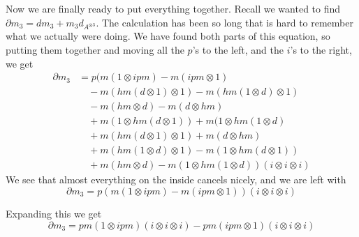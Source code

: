 Now we are finally ready to put everything together. Recall we wanted to find $\partial m_3 = dm_3 + m_3d_{A^{\otimes 3}}$. The calculation has been so long that is hard to remember what we actually were doing. We have found both parts of this equation, so putting them together and moving all the $p$'s to the left, and the $i$'s to the right, we get
\begin{align*}
    \partial m_3
    &=
    p(m(1\otimes ipm)-m(ipm\otimes 1) \\
    &\quad - m(hm(d\otimes 1)\otimes 1) - m(hm(1\otimes d)\otimes 1) \\
    &\quad -m(hm\otimes d)-m(d\otimes hm) \\
    &\quad +m(1\otimes hm(d\otimes 1))+m(1\otimes hm(1\otimes d) \\
    &\quad
    +m(hm(d\otimes 1)\otimes 1)
    +m(d\otimes hm) \\
    &\quad 
    +m(hm(1\otimes d)\otimes 1)
    -m(1\otimes hm(d\otimes 1)) \\
    &\quad  
    +m(hm\otimes d)
    -m(1\otimes hm(1\otimes d))(i\otimes i\otimes i)
\end{align*}
We see that almost everything on the inside cancels nicely, and we are left with 
\begin{equation*}
    \partial m_3 = p(m(1\otimes ipm)-m(ipm\otimes 1))(i\otimes i\otimes i)
\end{equation*}

Expanding this we get 
\begin{equation*}
    \partial m_3 = pm(1\otimes ipm)(i\otimes i\otimes i) - pm(ipm\otimes 1)(i\otimes i\otimes i)
\end{equation*}

